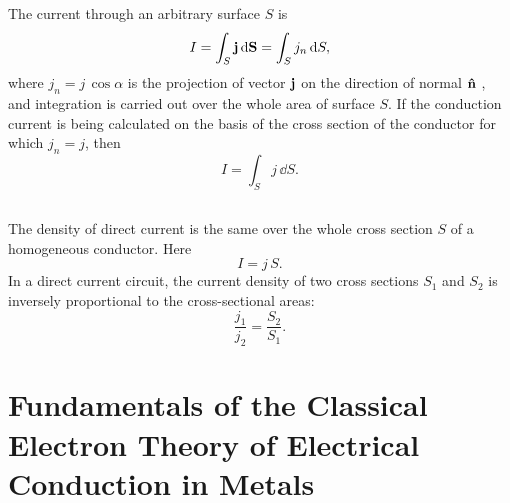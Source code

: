 \subsection{}\label{20.2.4} The current through an arbitrary surface $S$ is
\begin{equation*}%
 I = \int_{S} \vb{j} \, \dd \vb{S} = \int_{S} j_{n} \, \dd S,
\end{equation*}
where $j_{n} = j\, \cos \alpha$ is the projection of vector $\vb{j}$ on the direction of normal $\vu{n}$ , and integration is carried out over the whole area of surface $S$. If the conduction current is being calculated on the basis of the cross section of the conductor for which $j_{n} = j$, then
\begin{equation*}%
 I = \int_{S} j \, \dd S.
\end{equation*}

\subsection{}\label{20.2.5} The density of direct current is the same over the whole cross section $S$ of a homogeneous conductor. Here
\begin{equation*}%
 I = j \, S.
\end{equation*}
In a direct current circuit, the current density of two cross sections $S_{1}$ and $S_{2}$ is inversely proportional to the cross-sectional areas:
\begin{equation*}%
\frac{j_{1}}{j_{2}} = \frac{S_{2}}{S_{1}}.
\end{equation*}
\section[Electron Theory of Electrical Conduction]{Fundamentals of the Classical Electron Theory of Electrical Conduction in Metals}
\label{sec-20.3}

